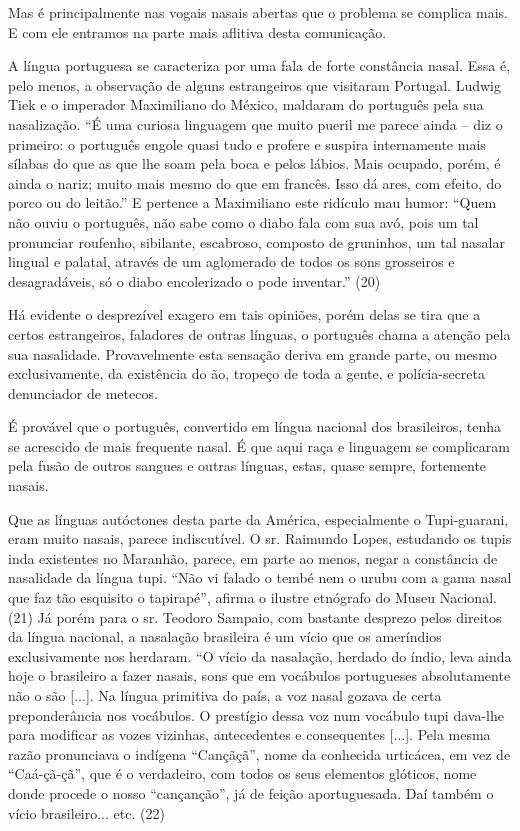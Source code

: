 Mas é principalmente nas vogais nasais abertas que o problema se
complica mais. E com ele entramos na parte mais aflitiva desta
comunicação.

A língua portuguesa se caracteriza por uma fala de forte constância
nasal. Essa é, pelo menos, a observação de alguns estrangeiros que
visitaram Portugal. Ludwig Tiek e o imperador Maximiliano do México,
maldaram do português pela sua nasalização. ``É uma curiosa linguagem
que muito pueril me parece ainda -- diz o primeiro: o português engole
quasi tudo e profere e suspira internamente mais sílabas do que as que
lhe soam pela boca e pelos lábios. Mais ocupado, porém, é ainda o nariz;
muito mais mesmo do que em francês. Isso dá ares, com efeito, do porco
ou do leitão.'' E pertence a Maximiliano este ridículo mau humor: ``Quem
não ouviu o português, não sabe como o diabo fala com sua avó, pois um
tal pronunciar roufenho, sibilante, escabroso, composto de gruninhos, um
tal nasalar lingual e palatal, através de um aglomerado de todos os sons
grosseiros e desagradáveis, só o diabo encolerizado o pode inventar.''
(20)

Há evidente o desprezível exagero em tais opiniões, porém delas se tira
que a certos estrangeiros, faladores de outras línguas, o português
chama a atenção pela sua nasalidade. Provavelmente esta sensação deriva
em grande parte, ou mesmo exclusivamente, da existência do ão, tropeço
de toda a gente, e polícia-secreta denunciador de metecos.

É provável que o português, convertido em língua nacional dos
brasileiros, tenha se acrescido de mais frequente nasal. É que aqui raça
e linguagem se complicaram pela fusão de outros sangues e outras
línguas, estas, quase sempre, fortemente nasais.

Que as línguas autóctones desta parte da América, especialmente o
Tupi-guarani, eram muito nasais, parece indiscutível. O sr. Raimundo
Lopes, estudando os tupis inda existentes no Maranhão, parece, em parte
ao menos, negar a constância de nasalidade da língua tupi. ``Não vi
falado o tembé nem o urubu com a gama nasal que faz tão esquisito o
tapirapé'', afirma o ilustre etnógrafo do Museu Nacional. (21) Já porém
para o sr. Teodoro Sampaio, com bastante desprezo pelos direitos da
língua nacional, a nasalação brasileira é um vício que os ameríndios
exclusivamente nos herdaram. ``O vício da nasalação, herdado do índio,
leva ainda hoje o brasileiro a fazer nasais, sons que em vocábulos
portugueses absolutamente não o são {[}...{]}. Na língua primitiva do
país, a voz nasal gozava de certa preponderância nos vocábulos. O
prestígio dessa voz num vocábulo tupi dava-lhe para modificar as vozes
vizinhas, antecedentes e consequentes {[}...{]}. Pela mesma razão
pronunciava o indígena ``Cançãçã'', nome da conhecida urticácea, em vez
de ``Caá-çã-çã'', que é o verdadeiro, com todos os seus elementos
glóticos, nome donde procede o nosso ``cançanção'', já de feição
aportuguesada. Daí também o vício brasileiro... etc. (22)


